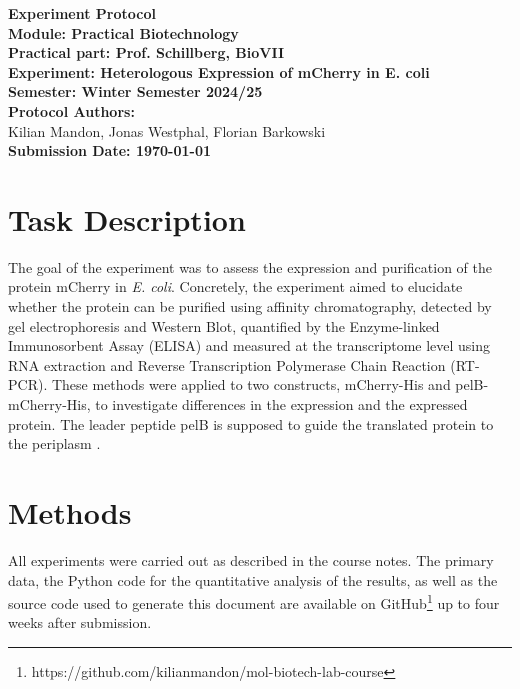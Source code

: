 \documentclass[a4paper,12pt]{article}
\begin{document}
\begin{titlepage}
    \begin{center}
        \textbf{\Huge Experiment Protocol}\\[2cm]
        
        \textbf{\LARGE Module: Practical Biotechnology}\\
        \textbf{\large Practical part: Prof. Schillberg, BioVII}\\[2cm]
        
        \textbf{\LARGE Experiment: Heterologous Expression of mCherry in E. coli}\\[2cm]
        
        \textbf{\large Semester: Winter Semester 2024/25}\\[2cm]
        
        \textbf{\large Protocol Authors: }\\
        Kilian Mandon, Jonas Westphal, Florian Barkowski\\
        [2cm]
        
        \textbf{\large Submission Date: \today}
    \end{center}
\end{titlepage}

\newpage
\tableofcontents
\newpage

\section{Task Description}
The goal of the experiment was to assess the expression and purification of the protein mCherry in \emph{E. coli}. Concretely, the experiment aimed to elucidate whether the protein can be purified using affinity chromatography, detected by gel electrophoresis and Western Blot, quantified by the Enzyme-linked Immunosorbent Assay (ELISA) and measured at the transcriptome level using RNA extraction and Reverse Transcription Polymerase Chain Reaction (RT-PCR). These methods were applied to two constructs, mCherry-His and pelB-mCherry-His, to investigate differences in the expression and the expressed protein. The leader peptide pelB is supposed to guide the translated protein to the periplasm \cite{Sockolosky2013}. 

\section{Methods}
All experiments were carried out as described in the course notes. The primary data, the Python code for the quantitative analysis of the results, as well as the source code used to generate this document are available on GitHub\footnote{https://github.com/kilianmandon/mol-biotech-lab-course} up to four weeks after submission.
\end{document}
